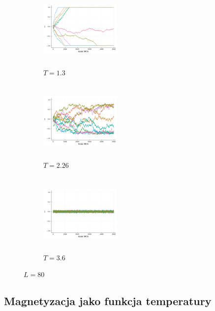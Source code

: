 \documentclass[12pt]{article}
\begin{document}
\begin{figure}[H]
  \centering

  \begin{subfigure}[b]{0.3\linewidth}
    \centering
    \includegraphics[width=150px, height=150px]{../data/magnetizations/80_T1.3.png}
    \caption{$T=1.3$}
    \label{fig:image1}
  \end{subfigure}
  \hfill
  \begin{subfigure}[b]{0.3\linewidth}
    \centering
    \includegraphics[width=150px, height=150px]{../data/magnetizations/80_T2.26.png}
    \caption{$T=2.26$}
    \label{fig:image2}
  \end{subfigure}
  \hfill
  \begin{subfigure}[b]{0.3\linewidth}
    \centering
    \includegraphics[width=150px, height=150px]{../data/magnetizations/80_T3.6.png}
    \caption{$T=3.6$}
    \label{fig:image3}
  \end{subfigure}

  \caption{$L=80$}
  \label{fig:series}
\end{figure}

\subsection{Magnetyzacja jako funkcja temperatury}
\end{document}

